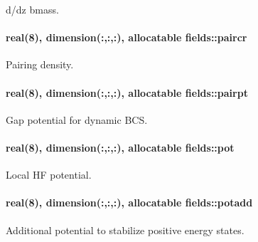 d/dz {\ttfamily bmass}. 

\paragraph[{\texorpdfstring{paircr}{paircr}}]{\setlength{\rightskip}{0pt plus 5cm}real(8), dimension(\+:,\+:,\+:), allocatable fields\+::paircr}\hypertarget{namespacefields_a7a53b33ec0000c8bbe276697057a6ba2}{}\label{namespacefields_a7a53b33ec0000c8bbe276697057a6ba2}


Pairing density. 

\paragraph[{\texorpdfstring{pairpt}{pairpt}}]{\setlength{\rightskip}{0pt plus 5cm}real(8), dimension(\+:,\+:,\+:), allocatable fields\+::pairpt}\hypertarget{namespacefields_a859b2a3cc162dfed2df581140528e6f7}{}\label{namespacefields_a859b2a3cc162dfed2df581140528e6f7}


Gap potential for dynamic B\+CS. 

\paragraph[{\texorpdfstring{pot}{pot}}]{\setlength{\rightskip}{0pt plus 5cm}real(8), dimension(\+:,\+:,\+:), allocatable fields\+::pot}\hypertarget{namespacefields_affeca5502efb412efc5ba78c00db92e5}{}\label{namespacefields_affeca5502efb412efc5ba78c00db92e5}


Local HF potential. 

\paragraph[{\texorpdfstring{potadd}{potadd}}]{\setlength{\rightskip}{0pt plus 5cm}real(8), dimension(\+:,\+:,\+:), allocatable fields\+::potadd}\hypertarget{namespacefields_a732b1496899b9d685f70149d2111def7}{}\label{namespacefields_a732b1496899b9d685f70149d2111def7}


Additional potential to stabilize positive energy states. 

